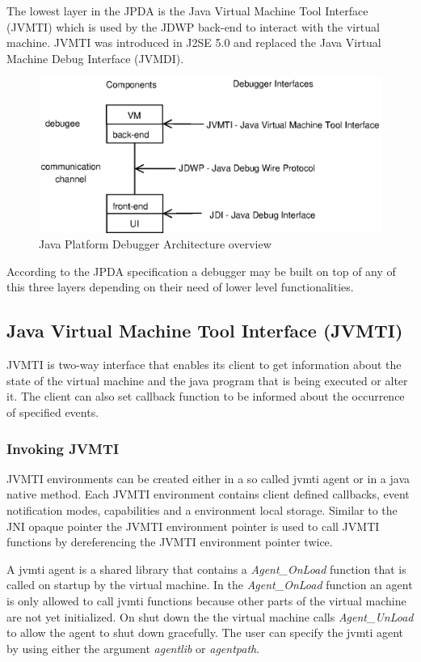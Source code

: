 The lowest layer in the JPDA is the Java Virtual Machine Tool Interface (JVMTI) which is used by the JDWP back-end to interact with the virtual machine. JVMTI was introduced in J2SE 5.0 and replaced the Java Virtual Machine Debug Interface (JVMDI).

\begin{figure}[h]
	\centering
	\includegraphics[scale=.75]{arch.eps}
	\caption{Java Platform Debugger Architecture overview\cite{jpda}}
	\label{fig:jdpa}
\end{figure}


According to the JPDA specification a debugger may be built on top of any of this three layers depending on their need of lower level functionalities.


\subsection{Java Virtual Machine Tool Interface (JVMTI)} %
JVMTI is two-way interface that enables its client to get information about the state of the virtual machine and the java program that is being executed or alter it. The client can also set callback function to be informed about the occurrence of specified events.

\subsubsection{Invoking JVMTI}
JVMTI environments can be created either in a so called jvmti agent or in a java native method. Each JVMTI environment contains client defined callbacks, event notification modes, capabilities and a environment local storage. Similar to the JNI opaque pointer the JVMTI environment pointer is used to call JVMTI functions by dereferencing the JVMTI environment pointer twice.

A jvmti agent is a shared library that contains a \textit{Agent\_OnLoad} function that is called on startup by the virtual machine. In the \textit{Agent\_OnLoad} function an agent is only allowed to call jvmti functions because other parts of the virtual machine are not yet initialized. On shut down the the virtual machine calls \textit{Agent\_UnLoad} to allow the agent to shut down gracefully. The user can specify the jvmti agent by using either the argument \textit{agentlib} or \textit{agentpath}.

